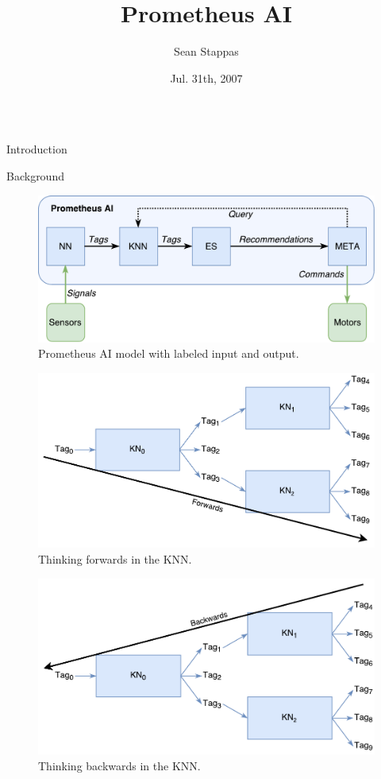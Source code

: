 \documentclass[final]{beamer} %
\title[Fancy Posters]{Prometheus AI}
\author{Sean Stappas}
\institute[RWTH Aachen University]{McGill University}
\date{Jul. 31th, 2007}
\begin{document}
\begin{columns}
	\begin{column}{.3\textwidth}
			\begin{block}{Introduction}
			\end{block}
			\begin{block}{Background}
				\begin{figure}[!htb]
					\includegraphics[width=\textwidth]{figures/ai_model_labeled.pdf}
					\caption{Prometheus AI model with labeled input and output.}
					\label{model_labeled}
				\end{figure}
			
				\begin{figure}[!htb]
					\includegraphics[width=0.5\columnwidth]{figures/forwards_thinking.pdf}
					\caption{Thinking forwards in the KNN.}
					\label{think_forwards}
				\end{figure}
				
				\begin{figure}[!htb]
					\includegraphics[width=0.5\columnwidth]{figures/backwards_thinking.pdf}
					\caption{Thinking backwards in the KNN.}
					\label{think_backwards}
				\end{figure}
				

\end{block}
\end{column}
\end{columns}
\end{document}
